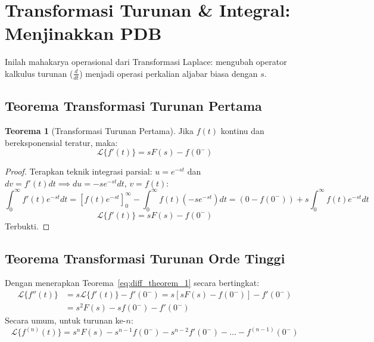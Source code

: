 \documentclass[11pt,a4paper]{article}
\theoremstyle{definition}
\newtheorem{theorem}{Teorema}[section]
\begin{document}
\section{Transformasi Turunan \& Integral: Menjinakkan PDB}

Inilah mahakarya operasional dari Transformasi Laplace: mengubah operator kalkulus turunan ($\frac{d}{dt}$) menjadi operasi perkalian aljabar biasa dengan $s$.

\subsection{Teorema Transformasi Turunan Pertama}

\begin{theorem}[Transformasi Turunan Pertama]
Jika $f(t)$ kontinu dan bereksponensial teratur, maka:
\begin{equation}
    \mathcal{L}\{f'(t)\} = s F(s) - f(0^-)
    \label{eq:diff_theorem_1}
\end{equation}
\end{theorem}

\begin{proof}
Terapkan teknik integrasi parsial: $u = e^{-st}$ dan $dv = f'(t) dt \implies du = -s e^{-st} dt$, $v = f(t)$:
\begin{equation*}
    \int_0^\infty f'(t) e^{-st} dt = \left[ f(t) e^{-st} \right]_0^\infty - \int_0^\infty f(t) (-s e^{-st}) dt = \left( 0 - f(0^-) \right) + s \int_0^\infty f(t) e^{-st} dt
\end{equation*}
\begin{equation*}
    \mathcal{L}\{f'(t)\} = s F(s) - f(0^-)
\end{equation*}
Terbukti.
\end{proof}

\subsection{Teorema Transformasi Turunan Orde Tinggi}

Dengan menerapkan Teorema~\ref{eq:diff_theorem_1} secara bertingkat:
\begin{align}
    \mathcal{L}\{f''(t)\} &= s \mathcal{L}\{f'(t)\} - f'(0^-) = s \left[ s F(s) - f(0^-) \right] - f'(0^-) \nonumber \\
    &= s^2 F(s) - s f(0^-) - f'(0^-) \label{eq:diff_theorem_2}
\end{align}
Secara umum, untuk turunan ke-$n$:
\begin{equation}
    \mathcal{L}\{f^{(n)}(t)\} = s^n F(s) - s^{n-1} f(0^-) - s^{n-2} f'(0^-) - \dots - f^{(n-1)}(0^-)
    \label{eq:diff_theorem_n}
\end{equation}
\end{document}
